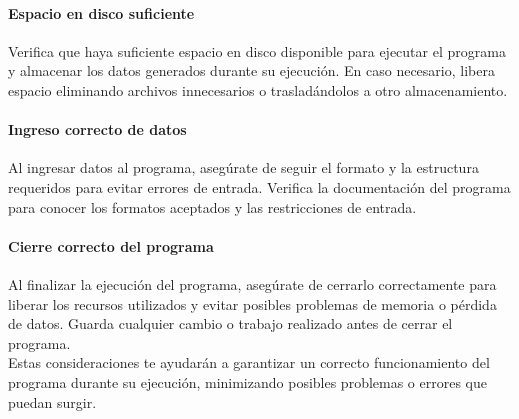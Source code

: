 \documentclass[a4paper,12pt]{article}
\begin{document}
\paragraph{Espacio en disco suficiente}
Verifica que haya suficiente espacio en disco disponible para ejecutar el programa y almacenar los datos generados durante su ejecución. En caso necesario, libera espacio eliminando archivos innecesarios o trasladándolos a otro almacenamiento.

\paragraph{Ingreso correcto de datos}
Al ingresar datos al programa, asegúrate de seguir el formato y la estructura requeridos para evitar errores de entrada. Verifica la documentación del programa para conocer los formatos aceptados y las restricciones de entrada.

\paragraph{Cierre correcto del programa}
Al finalizar la ejecución del programa, asegúrate de cerrarlo correctamente para liberar los recursos utilizados y evitar posibles problemas de memoria o pérdida de datos. Guarda cualquier cambio o trabajo realizado antes de cerrar el programa.\\

Estas consideraciones te ayudarán a garantizar un correcto funcionamiento del programa durante su ejecución, minimizando posibles problemas o errores que puedan surgir.
\end{document}
